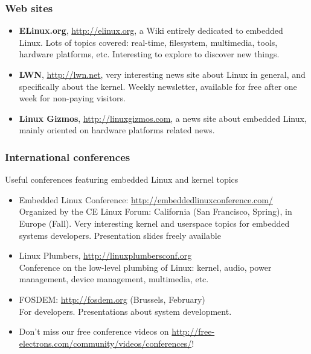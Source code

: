 \begin{frame}
  \frametitle{Web sites}
  \begin{itemize}
  \item {\bf ELinux.org}, \url{http://elinux.org}, a Wiki entirely
    dedicated to embedded Linux. Lots of topics covered: real-time,
    filesystem, multimedia, tools, hardware platforms,
    etc. Interesting to explore to discover new things.
  \item {\bf LWN}, \url{http://lwn.net}, very interesting news site
    about Linux in general, and specifically about the kernel. Weekly
    newsletter, available for free after one week for non-paying
    visitors.
  \item {\bf Linux Gizmos}, \url{http://linuxgizmos.com}, a news site
    about embedded Linux, mainly oriented on hardware platforms
    related news.
  \end{itemize}
\end{frame}

\begin{frame}
  \frametitle{International conferences}
  Useful conferences featuring embedded Linux and kernel topics
  \begin{itemize}
  \item Embedded Linux Conference: \url{http://embeddedlinuxconference.com/}\\
    Organized by the CE Linux Forum: California (San Francisco,
    Spring), in Europe (Fall).  Very interesting kernel and userspace
    topics for embedded systems developers.  Presentation slides
    freely available
  \item Linux Plumbers, \url{http://linuxplumbersconf.org}\\
    Conference on the low-level plumbing of Linux: kernel, audio,
    power management, device management, multimedia, etc.
  \item FOSDEM: \url{http://fosdem.org} (Brussels, February)\\
    For developers. Presentations about system development.
  \item Don't miss our free conference videos on
    \url{http://free-electrons.com/community/videos/conferences/}!
  \end{itemize}
\end{frame}
